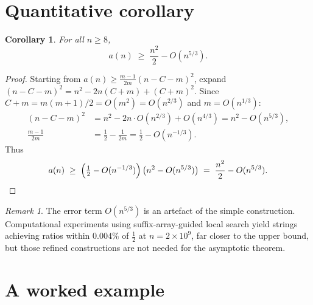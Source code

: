 \documentclass[12pt,a4paper]{article}
\theoremstyle{plain}
\newtheorem{corollary}[theorem]{Corollary}
\theoremstyle{definition}
\theoremstyle{remark}
\newtheorem{remark}[theorem]{Remark}
\begin{document}
\section{Quantitative corollary}\label{sec:quant}

\begin{corollary}
  For all $n \ge 8$,
  \[
    a(n) \;\ge\; \frac{n^2}{2} - O\!\left(n^{5/3}\right).
  \]
\end{corollary}

\begin{proof}
  Starting from $a(n) \ge \frac{m-1}{2m}(n - C - m)^2$, expand
  $(n - C - m)^2 = n^2 - 2n(C+m) + (C+m)^2$.  Since $C + m =
  m(m+1)/2 = O(m^2) = O(n^{2/3})$ and $m = O(n^{1/3})$:
  \begin{align*}
    (n - C - m)^2 &= n^2 - 2n \cdot O(n^{2/3}) + O(n^{4/3})
                   = n^2 - O(n^{5/3}),\\
    \frac{m-1}{2m} &= \frac{1}{2} - \frac{1}{2m} = \frac{1}{2} - O(n^{-1/3}).
  \end{align*}
  Thus
  \[
    a(n) \;\ge\; \left(\tfrac{1}{2} - O(n^{-1/3})\right)\bigl(n^2 - O(n^{5/3})\bigr)
         \;=\; \frac{n^2}{2} - O(n^{5/3}). \qedhere
  \]
\end{proof}

\begin{remark}
  The error term $O(n^{5/3})$ is an artefact of the simple construction.
  Computational experiments using suffix-array-guided local search
  yield strings achieving ratios within $0.004\%$ of $\frac{1}{2}$ at
  $n = 2\times 10^9$, far closer to the upper bound, but those
  refined constructions are not needed for the asymptotic theorem.
\end{remark}

\section{A worked example}\label{sec:example}
\end{document}
